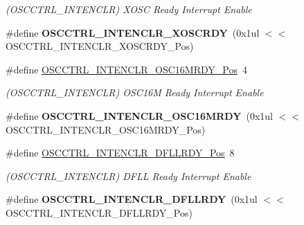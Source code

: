\begin{DoxyCompactItemize}
\begin{DoxyCompactList}\small\item\em (O\+S\+C\+C\+T\+R\+L\+\_\+\+I\+N\+T\+E\+N\+C\+L\+R) X\+O\+S\+C Ready Interrupt Enable \end{DoxyCompactList}\item 
\hypertarget{group___s_a_m_l21___o_s_c_c_t_r_l_ga7d7fb8725492be2dd6d56781ca8fe105}{}\#define {\bfseries O\+S\+C\+C\+T\+R\+L\+\_\+\+I\+N\+T\+E\+N\+C\+L\+R\+\_\+\+X\+O\+S\+C\+R\+D\+Y}~(0x1ul $<$$<$ O\+S\+C\+C\+T\+R\+L\+\_\+\+I\+N\+T\+E\+N\+C\+L\+R\+\_\+\+X\+O\+S\+C\+R\+D\+Y\+\_\+\+Pos)\label{group___s_a_m_l21___o_s_c_c_t_r_l_ga7d7fb8725492be2dd6d56781ca8fe105}

\item 
\hypertarget{group___s_a_m_l21___o_s_c_c_t_r_l_ga93cc541506f451ac27d54e8c96947145}{}\#define \hyperlink{group___s_a_m_l21___o_s_c_c_t_r_l_ga93cc541506f451ac27d54e8c96947145}{O\+S\+C\+C\+T\+R\+L\+\_\+\+I\+N\+T\+E\+N\+C\+L\+R\+\_\+\+O\+S\+C16\+M\+R\+D\+Y\+\_\+\+Pos}~4\label{group___s_a_m_l21___o_s_c_c_t_r_l_ga93cc541506f451ac27d54e8c96947145}

\begin{DoxyCompactList}\small\item\em (O\+S\+C\+C\+T\+R\+L\+\_\+\+I\+N\+T\+E\+N\+C\+L\+R) O\+S\+C16\+M Ready Interrupt Enable \end{DoxyCompactList}\item 
\hypertarget{group___s_a_m_l21___o_s_c_c_t_r_l_ga341715571ab59ea2c55c85ddeeaccd0c}{}\#define {\bfseries O\+S\+C\+C\+T\+R\+L\+\_\+\+I\+N\+T\+E\+N\+C\+L\+R\+\_\+\+O\+S\+C16\+M\+R\+D\+Y}~(0x1ul $<$$<$ O\+S\+C\+C\+T\+R\+L\+\_\+\+I\+N\+T\+E\+N\+C\+L\+R\+\_\+\+O\+S\+C16\+M\+R\+D\+Y\+\_\+\+Pos)\label{group___s_a_m_l21___o_s_c_c_t_r_l_ga341715571ab59ea2c55c85ddeeaccd0c}

\item 
\hypertarget{group___s_a_m_l21___o_s_c_c_t_r_l_ga34cb24a7f76328d1bb22092a9d238e1a}{}\#define \hyperlink{group___s_a_m_l21___o_s_c_c_t_r_l_ga34cb24a7f76328d1bb22092a9d238e1a}{O\+S\+C\+C\+T\+R\+L\+\_\+\+I\+N\+T\+E\+N\+C\+L\+R\+\_\+\+D\+F\+L\+L\+R\+D\+Y\+\_\+\+Pos}~8\label{group___s_a_m_l21___o_s_c_c_t_r_l_ga34cb24a7f76328d1bb22092a9d238e1a}

\begin{DoxyCompactList}\small\item\em (O\+S\+C\+C\+T\+R\+L\+\_\+\+I\+N\+T\+E\+N\+C\+L\+R) D\+F\+L\+L Ready Interrupt Enable \end{DoxyCompactList}\item 
\hypertarget{group___s_a_m_l21___o_s_c_c_t_r_l_ga625e9f37648734a4c7877ec3a89f8304}{}\#define {\bfseries O\+S\+C\+C\+T\+R\+L\+\_\+\+I\+N\+T\+E\+N\+C\+L\+R\+\_\+\+D\+F\+L\+L\+R\+D\+Y}~(0x1ul $<$$<$ O\+S\+C\+C\+T\+R\+L\+\_\+\+I\+N\+T\+E\+N\+C\+L\+R\+\_\+\+D\+F\+L\+L\+R\+D\+Y\+\_\+\+Pos)\label{group___s_a_m_l21___o_s_c_c_t_r_l_ga625e9f37648734a4c7877ec3a89f8304}


\end{DoxyCompactItemize}
